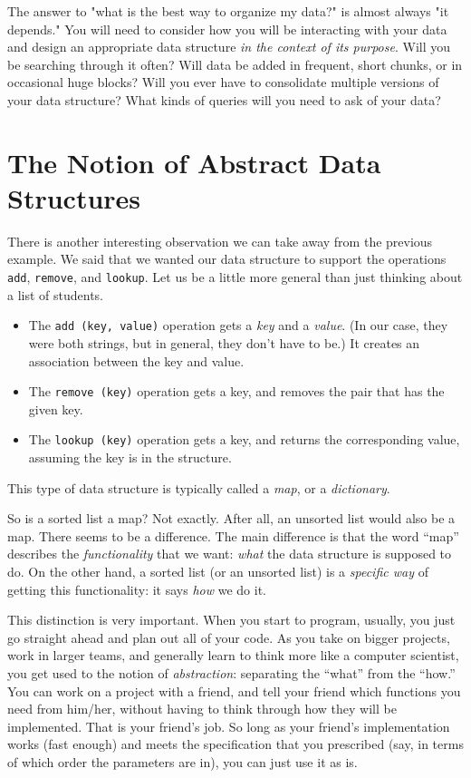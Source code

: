 The answer to "what is the best way to organize my data?" is almost always "it depends."
You will need to consider how you will be interacting with your data and design an appropriate data structure \emph{in the context of its purpose}. 
Will you be searching through it often?
Will data be added in frequent, short chunks, or in occasional huge blocks?
Will you ever have to consolidate multiple versions of your data structure?
What kinds of queries will you need to ask of your data?

\section{The Notion of Abstract Data Structures}

There is another interesting observation we can take away from the previous
example. We said that we wanted our data structure to support
the operations \texttt{add}, \texttt{remove}, and \texttt{lookup}.
Let us be a little more general than just thinking about a list of students.
\begin{itemize}
\item The \texttt{add (key, value)} operation gets a \emph{key} and a
  \emph{value}. (In our case, they were both strings, but in general,
  they don't have to be.)
  It creates an association between the key and value.
\item The \texttt{remove (key)} operation gets a key, and removes the
  pair that has the given key.
\item The \texttt{lookup (key)} operation gets a key, and returns the
  corresponding value, assuming the key is in the structure.
\end{itemize}
This type of data structure is typically called a \emph{map},
or a \emph{dictionary}.

So is a sorted list a map? Not exactly.
After all, an unsorted list would also be a map.
There seems to be a difference.
The main difference is that the word ``map'' describes the
\emph{functionality} that we want:
\emph{what} the data structure is supposed to do.
On the other hand, a sorted list (or an unsorted list) is a
\emph{specific way} of getting this functionality:
it says \emph{how} we do it. 

This distinction is very important. When you start to program,
usually, you just go straight ahead and plan out all of your code.
As you take on bigger projects, work in larger teams, and generally
learn to think more like a computer scientist, you get used to the 
notion of \emph{abstraction}: separating the ``what'' from the ``how.''
You can work on a project with a friend, and tell your friend
which functions you need from him/her, without having to think through
how they will be implemented. That is your friend's job.
So long as your friend's implementation works (fast enough) and meets
the specification that you prescribed (say, in terms of which order
the parameters are in), you can just use it as is.

